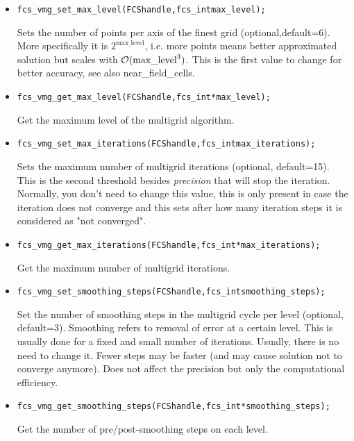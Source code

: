 \begin{itemize}

  \item
\begin{alltt}
fcs\_vmg\_set\_max\_level(FCS handle, fcs_int max_level);
\end{alltt}
Sets the number of points per axis of the finest grid (optional,default=6).
More specifically it is $2^{\text{max\_level}}$, i.e. more points means better approximated solution but scales with ${\cal O}(\text{max\_level}^3)$. This is the first value to change for better accuracy, see also near\_field\_cells.
  \item
\begin{alltt}
fcs\_vmg\_get\_max\_level(FCS handle, fcs\_int* max\_level);
\end{alltt}
Get the maximum level of the multigrid algorithm.

  \item
\begin{alltt}
fcs\_vmg\_set\_max\_iterations(FCS handle, fcs\_int max\_iterations);
\end{alltt}
Sets the maximum number of multigrid iterations (optional, default=15).
This is the second threshold besides \emph{precision} that will stop the iteration. Normally, you don't need to change this value, this is only present in case the iteration does not converge and this sets after how many iteration steps it is considered as "not converged".

  \item
\begin{alltt}
fcs\_vmg\_get\_max\_iterations(FCS handle, fcs\_int* max\_iterations);
\end{alltt}
Get the maximum number of multigrid iterations.

  \item
\begin{alltt}
fcs\_vmg\_set\_smoothing\_steps(FCS handle, fcs\_int smoothing\_steps);
\end{alltt}
Set the number of smoothing steps in the multigrid cycle per level (optional, default=3).
Smoothing refers to removal of error at a certain level. This is usually done for a fixed and small number of iterations. Usually, there is no need to change it. Fewer steps may be faster (and may cause solution not to converge anymore). Does not affect the precision but only the computational efficiency.

  \item
\begin{alltt}
fcs\_vmg\_get\_smoothing\_steps(FCS handle, fcs\_int *smoothing\_steps);
\end{alltt}
Get the number of pre/post-smoothing steps on each level.


\end{itemize}
